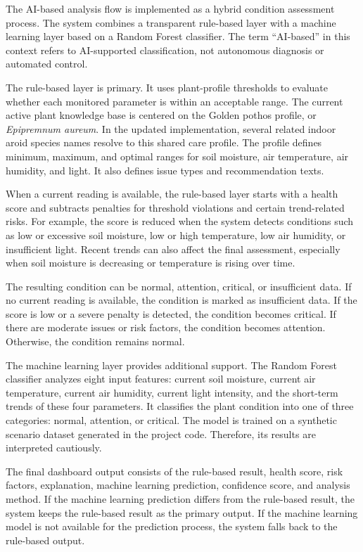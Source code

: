 The AI-based analysis flow is implemented as a hybrid condition assessment process. The system combines a transparent rule-based layer with a machine learning layer based on a Random Forest classifier. The term ``AI-based'' in this context refers to AI-supported classification, not autonomous diagnosis or automated control.

The rule-based layer is primary. It uses plant-profile thresholds to evaluate whether each monitored parameter is within an acceptable range. The current active plant knowledge base is centered on the Golden pothos profile, or \textit{Epipremnum aureum}. In the updated implementation, several related indoor aroid species names resolve to this shared care profile. The profile defines minimum, maximum, and optimal ranges for soil moisture, air temperature, air humidity, and light. It also defines issue types and recommendation texts.

When a current reading is available, the rule-based layer starts with a health score and subtracts penalties for threshold violations and certain trend-related risks. For example, the score is reduced when the system detects conditions such as low or excessive soil moisture, low or high temperature, low air humidity, or insufficient light. Recent trends can also affect the final assessment, especially when soil moisture is decreasing or temperature is rising over time.

The resulting condition can be normal, attention, critical, or insufficient data. If no current reading is available, the condition is marked as insufficient data. If the score is low or a severe penalty is detected, the condition becomes critical. If there are moderate issues or risk factors, the condition becomes attention. Otherwise, the condition remains normal.

The machine learning layer provides additional support. The Random Forest classifier analyzes eight input features: current soil moisture, current air temperature, current air humidity, current light intensity, and the short-term trends of these four parameters. It classifies the plant condition into one of three categories: normal, attention, or critical. The model is trained on a synthetic scenario dataset generated in the project code. Therefore, its results are interpreted cautiously.

The final dashboard output consists of the rule-based result, health score, risk factors, explanation, machine learning prediction, confidence score, and analysis method. If the machine learning prediction differs from the rule-based result, the system keeps the rule-based result as the primary output. If the machine learning model is not available for the prediction process, the system falls back to the rule-based output.

